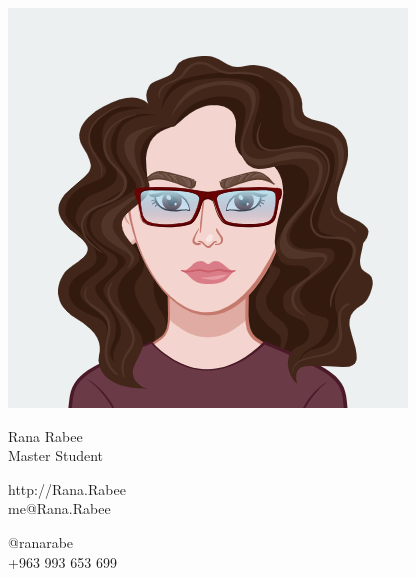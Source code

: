 \documentclass{article}
\begin{document}
\centering \includegraphics[width=.25\linewidth]{Avatar_logo}\\[5pt]
\parbox{2in}{\Large \centering Rana Rabee\\[1pt]
\normalsize Master Student}

\vfill
\raggedright
\begin{multicols}{2}
http://Rana.Rabee\\
me@Rana.Rabee

\columnbreak
\raggedleft
@ranarabe\\
+963 993 653 699%
\end{multicols}%
\end{document}
